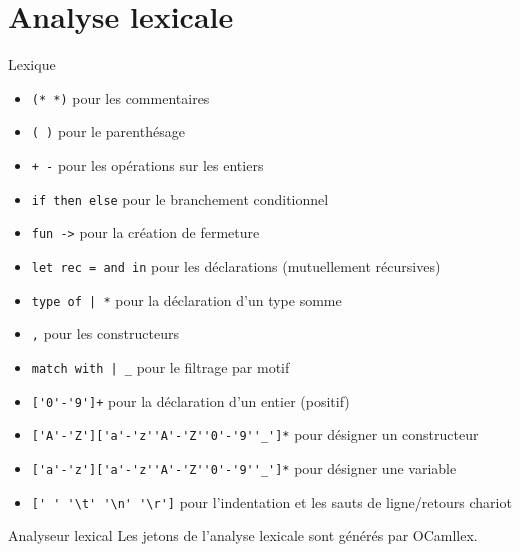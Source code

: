 \documentclass{beamer}
\begin{document}
\section{Analyse lexicale}


\begin{frame}[fragile]{Lexique}
    \begin{itemize}
        \item \lstinline{(* *)} pour les commentaires
        \item \lstinline{( )} pour le parenthésage
        \item \lstinline{+ -} pour les opérations sur les entiers
        \item \lstinline{if then else} pour le branchement conditionnel
        \item \lstinline{fun ->} pour la création de fermeture
        \item \lstinline{let rec = and in} pour les déclarations (mutuellement récursives)
        \item \lstinline{type of | *} pour la déclaration d'un type somme
        \item \lstinline{,} pour les constructeurs
        \item \lstinline{match with | _} pour le filtrage par motif
        \item \lstinline{['0'-'9']+} pour la déclaration d'un entier (positif)
        \item \lstinline{['A'-'Z']['a'-'z''A'-'Z''0'-'9''_']*} pour désigner un constructeur
        \item \lstinline{['a'-'z']['a'-'z''A'-'Z''0'-'9''_']*} pour désigner une variable
        \item \lstinline{[' ' '\t' '\n' '\r']} pour l'indentation et les sauts de ligne/retours chariot
    \end{itemize}
\end{frame}

\begin{frame}{Analyseur lexical}
    Les jetons de l'analyse lexicale sont générés par OCamllex.
\end{frame}
\end{document}
